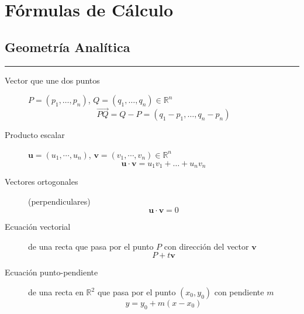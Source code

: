 
\sloppy

\section*{Fórmulas de Cálculo}

\footnotesize
{}

\begin{multicols}{2}
\subsection*{Geometría Analítica}

\begin{tcolorbox}[hbox, title=Vectores]
\begin{minipage}{0.4\textwidth}
\flushleft
\rule{0.4\textwidth}{0pt}
\begin{description}
\item[Vector que une dos puntos] $P=(p_1,\ldots,p_n)$, $Q=(q_1,\ldots,q_n)\in \mathbb{R}^n$
      \[
      \vec{PQ} = Q-P = (q_1-p_1,\ldots,q_n-p_n)
      \]
\item[Producto escalar] $\mathbf{u}=(u_1,\cdots,u_n)$, $\mathbf{v}=(v_1,\cdots,v_n)\in\mathbb{R}^n$
      \[
      \mathbf{u}\cdot \mathbf{v} = u_1v_1 + \ldots + u_nv_n
      \]
\item[Vectores ortogonales] (perpendiculares)
      \[
      \mathbf{u\cdot v}=0
      \]
\end{description}
\end{minipage}
\end{tcolorbox}

\begin{tcolorbox}[hbox, title=Rectas]
\begin{minipage}{0.4\textwidth}
\flushleft
\begin{description}
\item[Ecuación vectorial] de una recta que pasa por el punto $P$ con dirección del vector $\mathbf{v}$
      \[
      P+t\mathbf{v}
      \]
\item[Ecuación punto-pendiente] de una recta en $\mathbb{R}^2$ que pasa por el punto $(x_0,y_0)$ con pendiente $m$
      \[
      y=y_0+m(x-x_0)
      \]
\end{description}
\end{minipage}
\end{tcolorbox}


\end{multicols}
